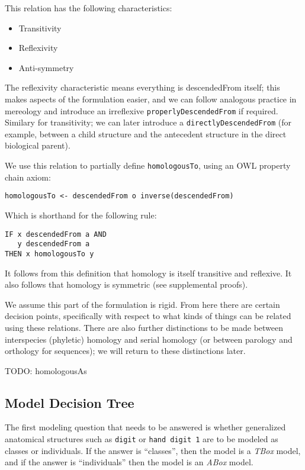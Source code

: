 This relation has the following characteristics:

\begin{itemize}
\itemsep1pt\parskip0pt
\item
  Transitivity
\item
  Reflexivity
\item
  Anti-symmetry
\end{itemize}

The reflexivity characteristic means everything is descendedFrom itself;
this makes aspects of the formulation easier, and we can follow
analogous practice in mereology and introduce an irreflexive
\texttt{properlyDescendedFrom} if required. Similary for transitivity;
we can later introduce a \texttt{directlyDescendedFrom} (for example,
between a child structure and the antecedent structure in the direct
biological parent).

We use this relation to partially define \texttt{homologousTo}, using an
OWL property chain axiom:

\begin{verbatim}
homologousTo <- descendedFrom o inverse(descendedFrom)
\end{verbatim}

Which is shorthand for the following rule:

\begin{verbatim}
IF x descendedFrom a AND
   y descendedFrom a
THEN x homologousTo y
\end{verbatim}

It follows from this definition that homology is itself transitive and
reflexive. It also follows that homology is symmetric (see supplemental
proofs).

We assume this part of the formulation is rigid. From here there are
certain decision points, specifically with respect to what kinds of
things can be related using these relations. There are also further
distinctions to be made between interspecies (phyletic) homology and
serial homology (or between parology and orthology for sequences); we
will return to these distinctions later.

TODO: homologousAs

\subsection{Model Decision Tree}\label{model-decision-tree}

The first modeling question that needs to be answered is whether
generalized anatomical structures such as \texttt{digit} or
\texttt{hand digit 1} are to be modeled as classes or individuals. If
the answer is ``classes'', then the model is a \emph{TBox} model, and if
the answer is ``individuals'' then the model is an \emph{ABox} model.


